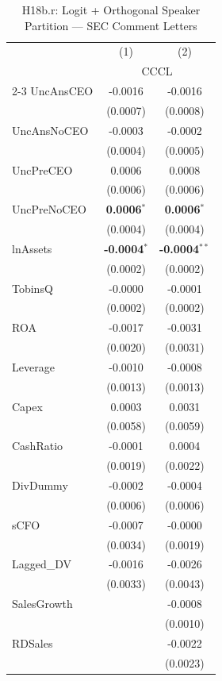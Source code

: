 \begin{landscape}
\begin{table}[H]
\setlength{\tabcolsep}{3pt}
\renewcommand{\arraystretch}{0.85}
\centering
\caption{H18b.r: Logit + Orthogonal Speaker Partition --- SEC Comment Letters}
\label{tab:h18b_robust}
\scriptsize
\begin{tabular}{lcc}
\toprule
 & (1) & (2) \\
 & \multicolumn{2}{c}{CCCL} \\
\cmidrule(lr){2-3}
\midrule
UncAnsCEO & -0.0016 & -0.0016 \\
 & (0.0007) & (0.0008) \\
UncAnsNoCEO & -0.0003 & -0.0002 \\
 & (0.0004) & (0.0005) \\
UncPreCEO & 0.0006 & 0.0008 \\
 & (0.0006) & (0.0006) \\
UncPreNoCEO & \textbf{0.0006}$^{*}$ & \textbf{0.0006}$^{*}$ \\
 & (0.0004) & (0.0004) \\
\midrule
lnAssets & \textbf{-0.0004}$^{*}$ & \textbf{-0.0004}$^{**}$ \\
 & (0.0002) & (0.0002) \\
TobinsQ & -0.0000 & -0.0001 \\
 & (0.0002) & (0.0002) \\
ROA & -0.0017 & -0.0031 \\
 & (0.0020) & (0.0031) \\
Leverage & -0.0010 & -0.0008 \\
 & (0.0013) & (0.0013) \\
Capex & 0.0003 & 0.0031 \\
 & (0.0058) & (0.0059) \\
CashRatio & -0.0001 & 0.0004 \\
 & (0.0019) & (0.0022) \\
DivDummy & -0.0002 & -0.0004 \\
 & (0.0006) & (0.0006) \\
sCFO & -0.0007 & -0.0000 \\
 & (0.0034) & (0.0019) \\
Lagged\_DV & -0.0016 & -0.0026 \\
 & (0.0033) & (0.0043) \\
SalesGrowth &  & -0.0008 \\
 &  & (0.0010) \\
RDSales &  & -0.0022 \\
 &  & (0.0023) \\

\end{tabular}
\end{table}
\end{landscape}
